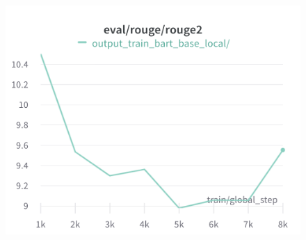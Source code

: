 \begin{figure}[!htb]
\includegraphics[width=\linewidth]{wandb/charts/Section-6-Panel-4-a7t98duha}
\caption{}
\endminipage
\end{figure}

